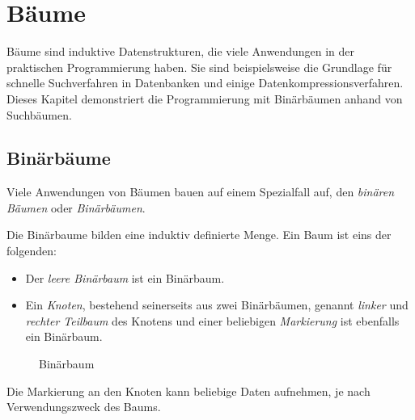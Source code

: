 
\chapter{Bäume}
\label{cha:trees}

Bäume sind induktive Datenstrukturen,
die viele Anwendungen in der praktischen
Programmierung haben.  Sie sind beispielsweise die Grundlage
für schnelle Suchverfahren in Datenbanken und einige
Datenkompressionsverfahren.  Dieses
Kapitel demonstriert die Programmierung mit Binärbäumen anhand von
Suchbäumen.

\section{Binärbäume}
\label{sec:trees}

Viele Anwendungen von Bäumen bauen auf einem
Spezialfall  auf, den \textit{binären Bäumen} oder \textit{Binärbäumen}.  

Die Binärbaume bilden eine induktiv definierte Menge.  Ein Baum ist
eins der folgenden:
%
\begin{itemize}
\item Der \textit{leere Binärbaum} ist ein Binärbaum.
\item Ein \textit{Knoten}, bestehend seinerseits aus zwei Binärbäumen,
  genannt \textit{linker} und \textit{rechter
    Teilbaum} des Knotens
  und einer beliebigen \textit{Markierung} ist ebenfalls ein
  Binärbaum.
\end{itemize}
%
\begin{figure}[h!]
\begin{pspdf}
\begin{center}
   { 
\end{center}
\end{pspdf}
  \caption{Binärbaum}
  \label{fig:bintree1}
\end{figure}
Die Markierung an den Knoten kann beliebige Daten aufnehmen, je nach
Verwendungszweck des Baums.

